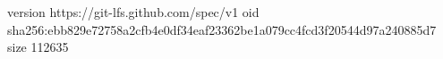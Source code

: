 version https://git-lfs.github.com/spec/v1
oid sha256:ebb829e72758a2cfb4e0df34eaf23362be1a079cc4fcd3f20544d97a240885d7
size 112635
